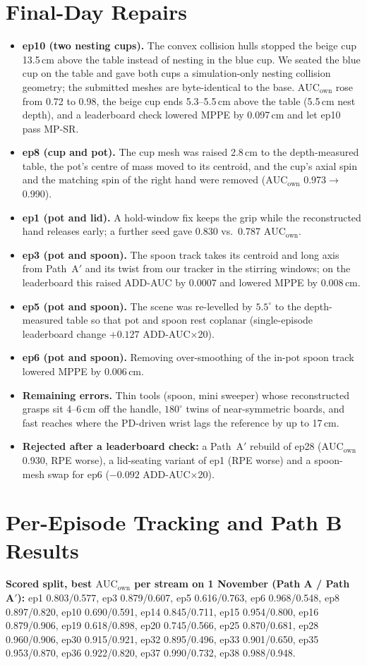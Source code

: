 \documentclass[10pt]{nvidiaextabstract}
\newcommand{\ownauc}{\ensuremath{\mathrm{AUC}_{\text{own}}}\xspace}
\begin{document}
\section{Final-Day Repairs}
\label{app:finalday}
\begin{itemize}
  \item \textbf{ep10 (two nesting cups).} The convex collision hulls stopped the beige cup 13.5\,cm above the table instead of nesting in the blue cup. We seated the blue cup on the table and gave both cups a simulation-only nesting collision geometry; the submitted meshes are byte-identical to the base. \ownauc rose from 0.72 to 0.98, the beige cup ends 5.3--5.5\,cm above the table (5.5\,cm nest depth), and a leaderboard check lowered MPPE by 0.097\,cm and let ep10 pass MP-SR.
  \item \textbf{ep8 (cup and pot).} The cup mesh was raised 2.8\,cm to the depth-measured table, the pot's centre of mass moved to its centroid, and the cup's axial spin and the matching spin of the right hand were removed (\ownauc 0.973$\rightarrow$0.990).
  \item \textbf{ep1 (pot and lid).} A hold-window fix keeps the grip while the reconstructed hand releases early; a further seed gave 0.830 vs.\ 0.787 \ownauc.
  \item \textbf{ep3 (pot and spoon).} The spoon track takes its centroid and long axis from Path~A$'$ and its twist from our tracker in the stirring windows; on the leaderboard this raised ADD-AUC by 0.0007 and lowered MPPE by 0.008\,cm.
  \item \textbf{ep5 (pot and spoon).} The scene was re-levelled by $5.5^\circ$ to the depth-measured table so that pot and spoon rest coplanar (single-episode leaderboard change $+0.127$ ADD-AUC$\times$20).
  \item \textbf{ep6 (pot and spoon).} Removing over-smoothing of the in-pot spoon track lowered MPPE by 0.006\,cm.
  \item \textbf{Remaining errors.} Thin tools (spoon, mini sweeper) whose reconstructed grasps sit 4--6\,cm off the handle, $180^\circ$ twins of near-symmetric boards, and fast reaches where the PD-driven wrist lags the reference by up to 17\,cm.
  \item \textbf{Rejected after a leaderboard check:} a Path~A$'$ rebuild of ep28 (\ownauc 0.930, RPE worse), a lid-seating variant of ep1 (RPE worse) and a spoon-mesh swap for ep6 ($-0.092$ ADD-AUC$\times$20).
\end{itemize}

\section{Per-Episode Tracking and Path B Results}
\textbf{Scored split, best \ownauc per stream on 1 November (Path A / Path A$'$):} ep1 0.803/0.577, ep3 0.879/0.607, ep5 0.616/0.763, ep6 0.968/0.548, ep8 0.897/0.820, ep10 0.690/0.591, ep14 0.845/0.711, ep15 0.954/0.800, ep16 0.879/0.906, ep19 0.618/0.898, ep20 0.745/0.566, ep25 0.870/0.681, ep28 0.960/0.906, ep30 0.915/0.921, ep32 0.895/0.496, ep33 0.901/0.650, ep35 0.953/0.870, ep36 0.922/0.820, ep37 0.990/0.732, ep38 0.988/0.948.
\end{document}
